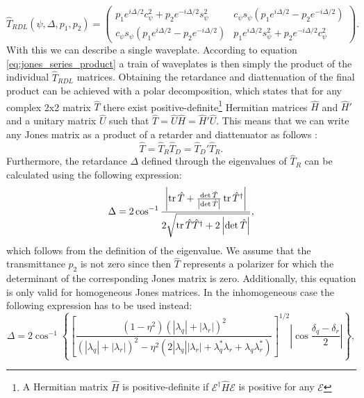 \begin{equation}
    \hat{T}_{RDL}(\psi, \Delta, p_1, p_2) = 
    \begin{pmatrix} 
    p_1e^{i\Delta/2}c_{\psi}^2+p_2e^{-i\Delta/2}s_{\psi}^2 & c_{\psi}s_{\psi}\left(p_1e^{i\Delta/2}-p_2e^{-i\Delta/2}\right) \\
    c_{\psi}s_{\psi}\left(p_1e^{i\Delta/2}-p_2e^{-i\Delta/2}\right) & 
    p_1e^{i\Delta/2}s_{\psi}^2+p_2e^{-i\Delta/2}c_{\psi}^2
    \end{pmatrix}.
\end{equation}
With this we can describe a single waveplate. According to equation \ref{eq:jones_series_product} a train of waveplates is then simply the product of the individual $\hat{T}_{RDL}$ matrices. Obtaining the retardance and diattenuation of the final product can be achieved with a polar decomposition, which states that for any complex 2x2 matrix $\hat{T}$ there exist positive-definite\footnote{A Hermitian matrix $\hat{H}$ is positive-definite if $\bm{\mathcal{E}}^{\dagger}\hat{H}\bm{\mathcal{E}}$ is positive for any $\bm{\mathcal{E}}$} Hermitian matrices $\hat{H}$ and $\hat{H}'$ and a unitary matrix $\hat{U}$ such that $\hat{T}=\hat{U}\hat{H}=\hat{H}'\hat{U}$. This means that we can write any Jones matrix as a product of a retarder and diattenuator as follows \cite{GilPerez2017PolarizedApproach}:
\begin{equation}
    \hat{T} = \hat{T}_R\hat{T}_D = \hat{T}_D'\hat{T}_R.
\end{equation}
Furthermore, the retardance $\Delta$ defined through the eigenvalues of $\hat{T}_R$ can be calculated using the following expression:
\begin{equation}
    \Delta = 2 \cos^{-1} \frac{\left|\operatorname{tr}\hat{T}+\frac{\det \hat{T}}{\left|\det \hat{T}\right|} \operatorname{tr} \hat{T}^{\dagger}\right|}{2\sqrt{\operatorname{tr} \hat{T}\hat{T}^{\dagger}+2\left|\det \hat{T}\right|}},
\end{equation}
which follows from the definition of the eigenvalue. We assume that the transmittance $p_2$ is not zero since then $\hat{T}$ represents a polarizer for which the determinant of the corresponding Jones matrix is zero. Additionally, this equation is only valid for homogeneous Jones matrices. In the inhomogeneous case the following expression has to be used instead:
\begin{equation}
    \label{eq:retardation_inhomogeneous}
    \Delta = 2\cos^{-1}\left\{\left[\frac{(1-\eta^2)(|\lambda_q|+|\lambda_r|)^2}
    {(|\lambda_q|+|\lambda_r|)^2-\eta^2(2|\lambda_q||\lambda_r|+\lambda_q^*\lambda_r+\lambda_q\lambda_r^*)}\right]^{1/2}\left|\cos \frac{\delta_q-\delta_r}{2}\right|\right\},
\end{equation}
